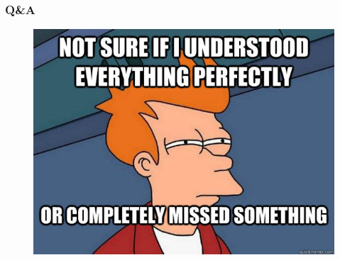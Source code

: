 \documentclass[aspectratio=169]{beamer}
\begin{document}
  \begin{frame}[foot]
    \frametitle{Q\&A}
    \begin{figure}
      \includegraphics[height=.95\textheight]{./gfx/futurama-fry-meme-00020.jpg}
    \end{figure}
  \end{frame}


\end{document}
